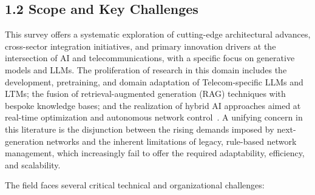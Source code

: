 \documentclass[11pt]{article}
\begin{document}
\subsection{1.2 Scope and Key Challenges}

This survey offers a systematic exploration of cutting-edge architectural advances, cross-sector integration initiatives, and primary innovation drivers at the intersection of AI and telecommunications, with a specific focus on generative models and LLMs. The proliferation of research in this domain includes the development, pretraining, and domain adaptation of Telecom-specific LLMs and LTMs; the fusion of retrieval-augmented generation (RAG) techniques with bespoke knowledge bases; and the realization of hybrid AI approaches aimed at real-time optimization and autonomous network control~\cite{ref1, ref2, ref3, ref4, ref5, ref6, ref7, ref8, ref9, ref10, ref11, ref12, ref13, ref14, ref15, ref16, ref17, ref18, ref19, ref20, ref21, ref22, ref23, ref24, ref25, ref26, ref27, ref28, ref29, ref30, ref31, ref32, ref33, ref34, ref35, ref36, ref37, ref38, ref39, ref40, ref46, ref49}. A unifying concern in this literature is the disjunction between the rising demands imposed by next-generation networks and the inherent limitations of legacy, rule-based network management, which increasingly fail to offer the required adaptability, efficiency, and scalability.

The field faces several critical technical and organizational challenges:
\end{document}
